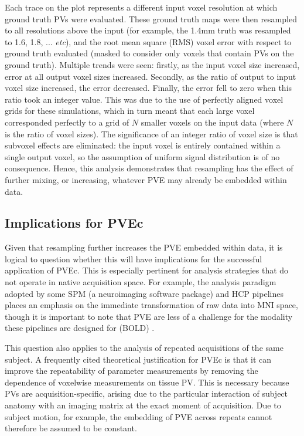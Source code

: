 \documentclass[12pt]{report}
\begin{document}
Each trace on the plot represents a different input voxel resolution at which ground truth PVs were evaluated. These ground truth maps were then resampled to all resolutions above the input (for example, the 1.4mm truth was resampled to 1.6, 1.8, ... \textit{etc}), and the root mean square (RMS) voxel error with respect to ground truth evaluated (masked to consider only voxels that contain PVs on the ground truth). Multiple trends were seen: firstly, as the input voxel size increased, error at all output voxel sizes increased. Secondly, as the ratio of output to input voxel size increased, the error decreased. Finally, the error fell to zero when this ratio took an integer value. This was due to the use of perfectly aligned voxel grids for these simulations, which in turn meant that each large voxel corresponded perfectly to a grid of $N$ smaller voxels on the input data (where $N$ is the ratio of voxel sizes). The significance of an integer ratio of voxel size is that subvoxel effects are eliminated: the input voxel is entirely contained within a single output voxel, so the assumption of uniform signal distribution is of no consequence. Hence, this analysis demonstrates that resampling has the effect of further mixing, or increasing, whatever PVE may already be embedded within data. 


\subsection{Implications for PVEc} 

Given that resampling further increases the PVE embedded within data, it is logical to question whether this will have implications for the successful application of PVEc. This is especially pertinent for analysis strategies that do not operate in native acquisition space. For example, the analysis paradigm adopted by some SPM (a neuroimaging software package) and HCP pipelines places an emphasis on the immediate transformation of raw data into MNI space, though it is important to note that PVE are less of a challenge for the modality these pipelines are designed for (BOLD) \cite{Glasser2013, Friston2003a}. 

This question also applies to the analysis of repeated acquisitions of the same subject. A frequently cited theoretical justification for PVEc is that it can improve the repeatability of parameter measurements by removing the dependence of voxelwise measurements on tissue PV. This is necessary because PVs are acquisition-specific, arising due to the particular interaction of subject anatomy with an imaging matrix at the exact moment of acquisition. Due to subject motion, for example, the embedding of PVE across repeats cannot therefore be assumed to be constant. 
\end{document}
